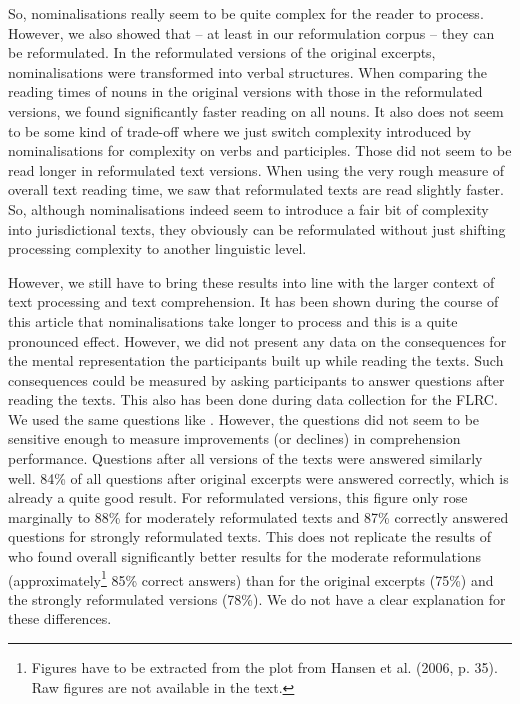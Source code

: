 \documentclass[output=paper]{langsci/langscibook}
\begin{document}
So, nominalisations really seem to be quite complex for the reader to process. However, we also showed that – at least in our reformulation corpus – they can be reformulated. In the reformulated versions of the original excerpts, nominalisations were transformed into verbal structures. When comparing the reading times of nouns in the original versions with those in the reformulated versions, we found significantly faster reading on all nouns. It also does not seem to be some kind of trade-off where we just switch complexity introduced by nominalisations for complexity on verbs and participles. Those did not seem to be read longer in reformulated text versions. When using the very rough measure of overall text reading time, we saw that reformulated texts are read slightly faster. So, although nominalisations indeed seem to introduce a fair bit of complexity into jurisdictional texts, they obviously can be reformulated without just shifting processing complexity to another linguistic level.

However, we still have to bring these results into line with the larger context of text processing and text comprehension. It has been shown during the course of this article that nominalisations take longer to process and this is a quite pronounced effect. However, we did not present any data on the consequences for the mental representation the participants built up while reading the texts. Such consequences could be measured by asking participants to answer questions after reading the texts. This also has been done during data collection for the FLRC. We used the same questions like \citet{Hansen2006}. However, the questions did not seem to be sensitive enough to measure improvements (or declines) in comprehension performance. Questions after all versions of the texts were answered similarly well. 84\% of all questions after original excerpts were answered correctly, which is already a quite good result. For reformulated versions, this figure only rose marginally to 88\% for moderately reformulated texts and 87\% correctly answered questions for strongly reformulated texts. This does not replicate the results of \citet{Hansen2006} who found overall significantly better results for the moderate reformulations (approximately\footnote{Figures have to be extracted from the plot from Hansen et al. (2006, p. 35). Raw figures are not available in the text. } 85\% correct answers) than for the original excerpts (75\%) and the strongly reformulated versions (78\%). We do not have a clear explanation for these differences.
\end{document}

